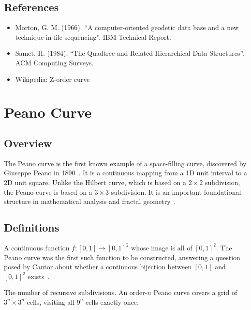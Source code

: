 \subsection{References}
\begin{itemize}
    \item Morton, G. M. (1966). ``A computer-oriented geodetic data base and a new technique in file sequencing''. IBM Technical Report.
    \item Samet, H. (1984). ``The Quadtree and Related Hierarchical Data Structures''. ACM Computing Surveys.
    \item Wikipedia: Z-order curve
\end{itemize}


\section{Peano Curve}
\label{sec:peano_curve}

\subsection{Overview}
The Peano curve is the first known example of a space-filling curve, discovered by Giuseppe Peano in 1890~\cite{peano1890}. It is a continuous mapping from a 1D unit interval to a 2D unit square. Unlike the Hilbert curve, which is based on a $2 \times 2$ subdivision, the Peano curve is based on a $3 \times 3$ subdivision. It is an important foundational structure in mathematical analysis and fractal geometry~\cite{sagan1994}.

\subsection{Definitions}
\begin{definition}\label{def:peano_space_filling}
A continuous function $f \colon [0,1] \to [0,1]^2$ whose image is all of $[0,1]^2$. The Peano curve was the first such function to be constructed, answering a question posed by Cantor about whether a continuous bijection between $[0,1]$ and $[0,1]^2$ exists~\cite{peano1890}.
\end{definition}

\begin{definition}\label{def:peano_order}
The number of recursive subdivisions. An order-$n$ Peano curve covers a grid of $3^n \times 3^n$ cells, visiting all $9^n$ cells exactly once.
\end{definition}

